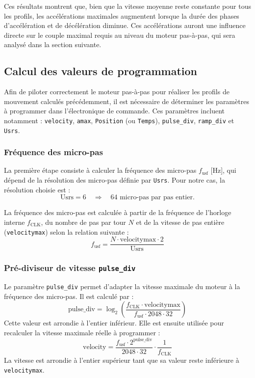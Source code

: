 Ces résultats montrent que, bien que la vitesse moyenne reste constante pour tous les profils, les accélérations maximales augmentent lorsque la durée des phases d’accélération et de décélération diminue. Ces accélérations auront une influence directe sur le couple maximal requis au niveau du moteur pas-à-pas, qui sera analysé dans la section suivante.



\subsection{ Calcul des valeurs de programmation}
Afin de piloter correctement le moteur pas-à-pas pour réaliser les profils de mouvement calculés précédemment, il est nécessaire de déterminer les paramètres à programmer dans l’électronique de commande. Ces paramètres incluent notamment : \texttt{velocity}, \texttt{amax}, \texttt{Position} (ou \texttt{Temps}), \texttt{pulse\_div}, \texttt{ramp\_div} et \texttt{Usrs}.

\subsubsection{Fréquence des micro-pas}

La première étape consiste à calculer la fréquence des micro-pas \(f_{\text{usf}}\) [Hz], qui dépend de la résolution des micro-pas définie par \texttt{Usrs}. Pour notre cas, la résolution choisie est :
\[
\text{Usrs} = 6 \quad \Rightarrow \quad 64 \text{ micro-pas par pas entier}.
\]

La fréquence des micro-pas est calculée à partir de la fréquence de l’horloge interne \(f_{\text{CLK}}\), du nombre de pas par tour \(N\) et de la vitesse de pas entière (\texttt{velocitymax}) selon la relation suivante :
\begin{equation}
f_{\text{usf}} = \frac{N \cdot \text{velocitymax} \cdot 2}{\text{Usrs}}
\end{equation}

\subsubsection{Pré-diviseur de vitesse \texttt{pulse\_div}}

Le paramètre \texttt{pulse\_div} permet d’adapter la vitesse maximale du moteur à la fréquence des micro-pas. Il est calculé par :
\begin{equation}
\text{pulse\_div} = \log_2 \left( \frac{f_{\text{CLK}} \cdot \text{velocitymax}}{f_{\text{usf}} \cdot 2048 \cdot 32} \right)
\end{equation}
Cette valeur est arrondie à l’entier inférieur. Elle est ensuite utilisée pour recalculer la vitesse maximale réelle à programmer :
\begin{equation}
\text{velocity} = \frac{f_{\text{usf}} \cdot 2^{\text{pulse\_div}}}{2048 \cdot 32} \cdot \frac{1}{f_{\text{CLK}}}
\end{equation}
La vitesse est arrondie à l’entier supérieur tant que sa valeur reste inférieure à \texttt{velocitymax}.

